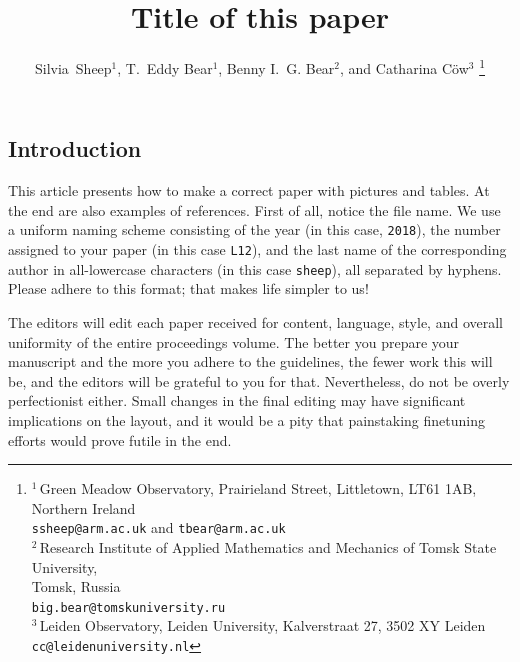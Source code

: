 \documentclass[10pt,a4paper,twoside]{article}
\begin{document}
\SetPaperBodyFont

\begin{IMCpaper}{
\title{Title of this paper}
\author{Silvia~Sheep$^1$, T.~Eddy Bear$^1$, Benny I.~G. Bear$^2$, and
  Catharina C\"ow$^3$
        \thanks{$^1\,$Green Meadow Observatory, Prairieland Street,
          Littletown, LT61 1AB, 
                Northern Ireland\\
                     \texttt{ssheep@arm.ac.uk} \mbox{\rm and}
                     \texttt{tbear@arm.ac.uk}\\[1ex]
                $^2\,$Research Institute of Applied Mathematics and
                      Mechanics of Tomsk State University,\\
                      Tomsk, Russia\\ 
                     \texttt{big.bear@tomskuniversity.ru}\\[1ex]
                $^3\,$Leiden Observatory, Leiden University,
                     Kalverstraat 27, 3502 XY Leiden\\
                     \texttt{cc@leidenuniversity.nl}}}%
}%
%
%
%
%
\vspace*{-3\baselineskip}
\section{Introduction}
This article presents how to make a correct paper with pictures and
tables. At the end are also examples of references. First of all,
notice the file name. We use a uniform naming scheme consisting of the
year (in this case, \texttt{2018}), the number assigned to your paper
(in this case \texttt{L12}), and the last name of the corresponding
author in all-lowercase characters (in this case \texttt{sheep}), all
separated by hyphens. Please adhere to this format; that makes life simpler
to us!

The editors will edit each paper received for content, language,
style, and overall uniformity of the entire proceedings volume. The
better you prepare your man\-u\-script and the more you adhere to the
guidelines, the fewer work this will be, and the editors will be
grateful to you for that. Nevertheless, do not be overly perfectionist
either. Small changes in the final editing may have significant
implications on the layout, and it would be a pity that painstaking
finetuning efforts would prove futile in the end.


\end{IMCpaper}
\end{document}
